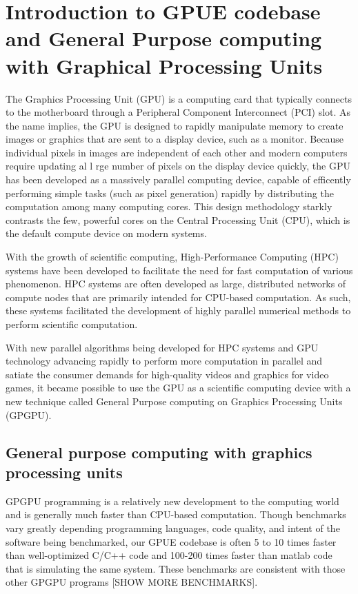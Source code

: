 \chapter{Introduction to GPUE codebase and General Purpose computing with Graphical Processing Units}
\label{ch-gpu}

The Graphics Processing Unit (GPU) is a computing card that typically connects to the motherboard through a Peripheral Component Interconnect (PCI) slot.
As the name implies,
the GPU is designed to rapidly manipulate memory to create images or graphics that are sent to a display device, such as a monitor.
Because individual pixels in images are independent of each other and modern computers require updating al l rge number of pixels on the display device quickly, the GPU has been developed as a massively parallel computing device, capable of efficently performing simple tasks (such as pixel generation) rapidly by distributing the computation among many computing cores.
This design methodology starkly contrasts the few, powerful cores on the Central Processing Unit (CPU), which is the default compute device on modern systems.

With the growth of scientific computing, High-Performance Computing (HPC) systems have been developed to facilitate the need for fast computation of various phenomenon.
HPC systems are often developed as large, distributed networks of compute nodes that are primarily intended for CPU-based computation.
As such, these systems facilitated the development of highly parallel numerical methods to perform scientific computation.

With new parallel algorithms being developed for HPC systems and GPU technology advancing rapidly to perform more computation in parallel and satiate the consumer demands for high-quality videos and graphics for video games, it became possible to use the GPU as a scientific computing device with a new technique called General Purpose computing on Graphics Processing Units (GPGPU).

\section{General purpose computing with graphics processing units}

GPGPU programming is a relatively new development to the computing world and is generally much faster than CPU-based computation.
Though benchmarks vary greatly depending programming languages, code quality, and intent of the software being benchmarked, our GPUE codebase is often 5 to 10 times faster than well-optimized C/C++ code and 100-200 times faster than matlab code that is simulating the same system.
These benchmarks are consistent with those other GPGPU programs [SHOW MORE BENCHMARKS].


